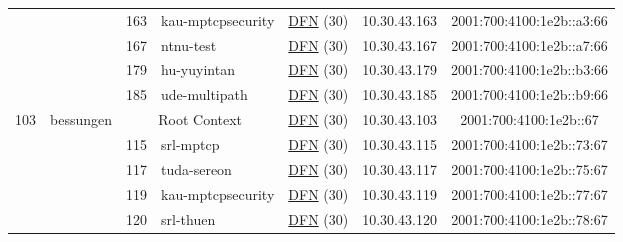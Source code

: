 \begin{small}
\begin{center}
\begin{longtable}{|c|c|c|c|c|c|c|c|}
  &  & \tiny{163} & \multicolumn{1}{|l|}{\tiny{kau-mptcpsecurity}} & \multicolumn{2}{|c|}{\tiny{\href{https://www.dfn.de}{DFN} (30)}} & \tiny{10.30.43.163} & \tiny{2001:700:4100:1e2b::a3:66} \\* \cline{3-3}\cline{4-4}\cline{5-5}\cline{6-6}\cline{7-7}\cline{8-8}
  &  & \tiny{167} & \multicolumn{1}{|l|}{\tiny{ntnu-test}} & \multicolumn{2}{|c|}{\tiny{\href{https://www.dfn.de}{DFN} (30)}} & \tiny{10.30.43.167} & \tiny{2001:700:4100:1e2b::a7:66} \\* \cline{3-3}\cline{4-4}\cline{5-5}\cline{6-6}\cline{7-7}\cline{8-8}
  &  & \tiny{179} & \multicolumn{1}{|l|}{\tiny{hu-yuyintan}} & \multicolumn{2}{|c|}{\tiny{\href{https://www.dfn.de}{DFN} (30)}} & \tiny{10.30.43.179} & \tiny{2001:700:4100:1e2b::b3:66} \\* \cline{3-3}\cline{4-4}\cline{5-5}\cline{6-6}\cline{7-7}\cline{8-8}
  &  & \tiny{185} & \multicolumn{1}{|l|}{\tiny{ude-multipath}} & \multicolumn{2}{|c|}{\tiny{\href{https://www.dfn.de}{DFN} (30)}} & \tiny{10.30.43.185} & \tiny{2001:700:4100:1e2b::b9:66} \\ \hline
 \multirow{17}{*}{\tiny{103}} & \multicolumn{1}{|l|}{\multirow{17}{*}{\tiny{bessungen}}} & \multicolumn{2}{|c|}{\tiny{Root Context}} & \multicolumn{2}{|c|}{\tiny{\href{https://www.dfn.de}{DFN} (30)}} & \tiny{10.30.43.103} & \tiny{2001:700:4100:1e2b::67} \\* \cline{3-3}\cline{4-4}\cline{5-5}\cline{6-6}\cline{7-7}\cline{8-8}
  &  & \tiny{115} & \multicolumn{1}{|l|}{\tiny{srl-mptcp}} & \multicolumn{2}{|c|}{\tiny{\href{https://www.dfn.de}{DFN} (30)}} & \tiny{10.30.43.115} & \tiny{2001:700:4100:1e2b::73:67} \\* \cline{3-3}\cline{4-4}\cline{5-5}\cline{6-6}\cline{7-7}\cline{8-8}
  &  & \tiny{117} & \multicolumn{1}{|l|}{\tiny{tuda-sereon}} & \multicolumn{2}{|c|}{\tiny{\href{https://www.dfn.de}{DFN} (30)}} & \tiny{10.30.43.117} & \tiny{2001:700:4100:1e2b::75:67} \\* \cline{3-3}\cline{4-4}\cline{5-5}\cline{6-6}\cline{7-7}\cline{8-8}
  &  & \tiny{119} & \multicolumn{1}{|l|}{\tiny{kau-mptcpsecurity}} & \multicolumn{2}{|c|}{\tiny{\href{https://www.dfn.de}{DFN} (30)}} & \tiny{10.30.43.119} & \tiny{2001:700:4100:1e2b::77:67} \\* \cline{3-3}\cline{4-4}\cline{5-5}\cline{6-6}\cline{7-7}\cline{8-8}
  &  & \tiny{120} & \multicolumn{1}{|l|}{\tiny{srl-thuen}} & \multicolumn{2}{|c|}{\tiny{\href{https://www.dfn.de}{DFN} (30)}} & \tiny{10.30.43.120} & \tiny{2001:700:4100:1e2b::78:67} \\* \cline{3-3}\cline{4-4}\cline{5-5}\cline{6-6}\cline{7-7}\cline{8-8}

\end{longtable}
\end{center}
\end{small}

